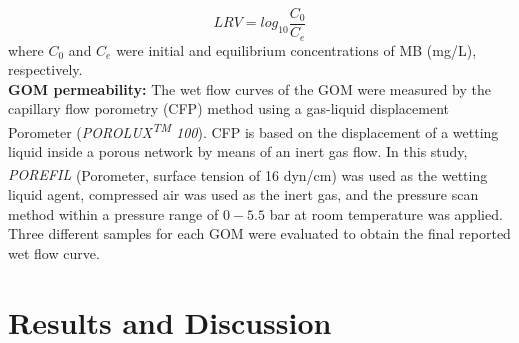 \begin{equation}
  LRV ={log_{10} \dfrac{C_0}{C_e}}
 \label{eqn3_pap3}
\end{equation}
where $C_0$ and $C_e$ were initial and equilibrium concentrations of MB (mg/L), respectively.\\
\textbf{GOM permeability:} The wet flow curves of the GOM were measured by the capillary flow porometry (CFP) method using a gas-liquid displacement Porometer (\textit{POROLUX\textsuperscript{TM} 100}). CFP is based on the displacement of a wetting liquid inside a porous network by means of an inert gas flow. In this study, \textit{POREFIL\textsuperscript{\tiny\textregistered}} (Porometer, surface tension of 16 dyn/cm) was used as the wetting liquid agent, compressed air was used as the inert gas, and the pressure scan method within a pressure range of $0-5.5$ bar at room temperature was applied. Three different samples for each GOM were evaluated to obtain the final reported wet flow curve.
\section{Results and Discussion}
